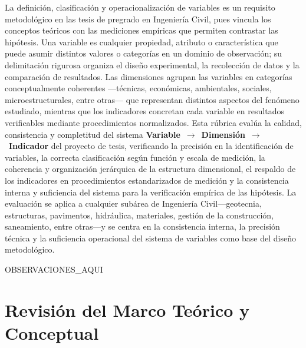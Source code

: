 \documentclass[12pt,a4paper]{report}
\begin{document}
La definición, clasificación y operacionalización de variables es un requisito metodológico en las tesis de pregrado en Ingeniería Civil, pues vincula los conceptos teóricos con las mediciones empíricas que permiten contrastar las hipótesis. Una variable es cualquier propiedad, atributo o característica que puede asumir distintos valores o categorías en un dominio de observación; su delimitación rigurosa organiza el diseño experimental, la recolección de datos y la comparación de resultados. Las dimensiones agrupan las variables en categorías conceptualmente coherentes —técnicas, económicas, ambientales, sociales, microestructurales, entre otras— que representan distintos aspectos del fenómeno estudiado, mientras que los indicadores concretan cada variable en resultados verificables mediante procedimientos normalizados. Esta rúbrica evalúa la calidad, consistencia y completitud del sistema \textbf{Variable}~$\rightarrow$~\textbf{Dimensión}~$\rightarrow$~\textbf{Indicador} del proyecto de tesis, verificando la precisión en la identificación de variables, la correcta clasificación según función y escala de medición, la coherencia y organización jerárquica de la estructura dimensional, el respaldo de los indicadores en procedimientos estandarizados de medición y la consistencia interna y suficiencia del sistema para la verificación empírica de las hipótesis. La evaluación se aplica a cualquier subárea de Ingeniería Civil—geotecnia, estructuras, pavimentos, hidráulica, materiales, gestión de la construcción, saneamiento, entre otras—y se centra en la consistencia interna, la precisión técnica y la suficiencia operacional del sistema de variables como base del diseño metodológico.


{{OBSERVACIONES_AQUI}}


\section{Revisión del Marco Teórico y Conceptual}
\end{document}
